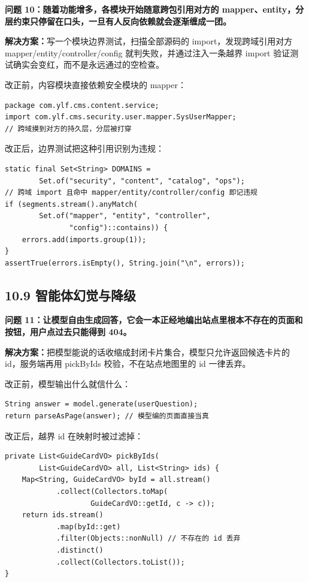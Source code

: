 \documentclass[zihao=-4,UTF8,openany]{ctexart}
\renewcommand{\_}{\textunderscore\allowbreak}
\begin{document}
\noindent\textbf{问题 10：随着功能增多，各模块开始随意跨包引用对方的 mapper、entity，分层约束只停留在口头，一旦有人反向依赖就会逐渐缠成一团。}

\textbf{解决方案：}写一个模块边界测试，扫描全部源码的 import，发现跨域引用对方 mapper/entity/controller/config 就判失败，并通过注入一条越界 import 验证测试确实会变红，而不是永远通过的空检查。

改正前，内容模块直接依赖安全模块的 mapper：

\begin{lstlisting}
package com.ylf.cms.content.service;
import com.ylf.cms.security.user.mapper.SysUserMapper;
// 跨域摸到对方的持久层，分层被打穿
\end{lstlisting}

改正后，边界测试把这种引用识别为违规：

\begin{lstlisting}
static final Set<String> DOMAINS =
        Set.of("security", "content", "catalog", "ops");
// 跨域 import 且命中 mapper/entity/controller/config 即记违规
if (segments.stream().anyMatch(
        Set.of("mapper", "entity", "controller",
               "config")::contains)) {
    errors.add(imports.group(1));
}
assertTrue(errors.isEmpty(), String.join("\n", errors));
\end{lstlisting}

\subsection*{\texorpdfstring{\textbf{10.9 智能体幻觉与降级}}{10.9 智能体幻觉与降级}}\label{ux667aux80fdux4f53ux5e7bux89c9}

\noindent\textbf{问题 11：让模型自由生成回答，它会一本正经地编出站点里根本不存在的页面和按钮，用户点过去只能得到 404。}

\textbf{解决方案：}把模型能说的话收缩成封闭卡片集合，模型只允许返回候选卡片的 id，服务端再用 pickByIds 校验，不在站点地图里的 id 一律丢弃。

改正前，模型输出什么就信什么：

\begin{lstlisting}
String answer = model.generate(userQuestion);
return parseAsPage(answer); // 模型编的页面直接当真
\end{lstlisting}

改正后，越界 id 在映射时被过滤掉：

\begin{lstlisting}
private List<GuideCardVO> pickByIds(
        List<GuideCardVO> all, List<String> ids) {
    Map<String, GuideCardVO> byId = all.stream()
            .collect(Collectors.toMap(
                    GuideCardVO::getId, c -> c));
    return ids.stream()
            .map(byId::get)
            .filter(Objects::nonNull) // 不存在的 id 丢弃
            .distinct()
            .collect(Collectors.toList());
}
\end{lstlisting}
\end{document}
